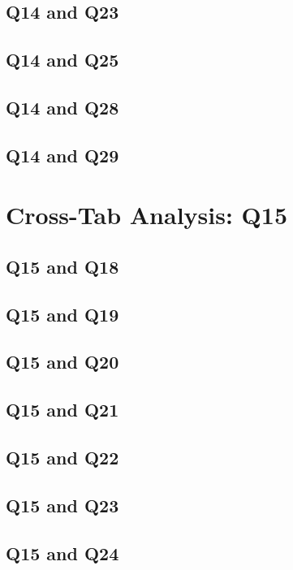 \documentclass{report}
\begin{document}
\section{Q14 and Q23}\clearpage
\section{Q14 and Q25}\clearpage
\section{Q14 and Q28}\clearpage
\section{Q14 and Q29}\clearpage

\chapter{Cross-Tab Analysis: Q15}

\section{Q15 and Q18}\clearpage
\section{Q15 and Q19}\clearpage
\section{Q15 and Q20}\clearpage
\section{Q15 and Q21}\clearpage
\section{Q15 and Q22}\clearpage
\section{Q15 and Q23}\clearpage
\section{Q15 and Q24}\clearpage
\end{document}
